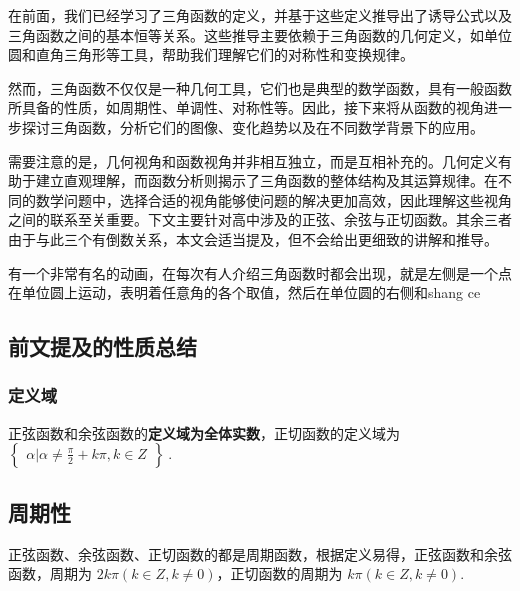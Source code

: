 
\begin{issues}
\issueDraft
\end{issues}


在前面，我们已经学习了三角函数的定义，并基于这些定义推导出了诱导公式以及三角函数之间的基本恒等关系。这些推导主要依赖于三角函数的几何定义，如单位圆和直角三角形等工具，帮助我们理解它们的对称性和变换规律。

然而，三角函数不仅仅是一种几何工具，它们也是典型的数学函数，具有一般函数所具备的性质，如周期性、单调性、对称性等。因此，接下来将从函数的视角进一步探讨三角函数，分析它们的图像、变化趋势以及在不同数学背景下的应用。

需要注意的是，几何视角和函数视角并非相互独立，而是互相补充的。几何定义有助于建立直观理解，而函数分析则揭示了三角函数的整体结构及其运算规律。在不同的数学问题中，选择合适的视角能够使问题的解决更加高效，因此理解这些视角之间的联系至关重要。下文主要针对高中涉及的正弦、余弦与正切函数。其余三者由于与此三个有倒数关系，本文会适当提及，但不会给出更细致的讲解和推导。

有一个非常有名的动画，在每次有人介绍三角函数时都会出现，就是左侧是一个点在单位圆上运动，表明着任意角的各个取值，然后在单位圆的右侧和shang ce

\subsection{前文提及的性质总结}

\subsubsection{定义域}

正弦函数和余弦函数的\textbf{定义域为全体实数}，正切函数的定义域为 $\begin{Bmatrix}\alpha|\alpha \neq \frac{\pi}{2}+k\pi,k\in Z\end{Bmatrix}~.$

\subsection{周期性}

正弦函数、余弦函数、正切函数的都是周期函数，根据定义易得，正弦函数和余弦函数，周期为 $2k\pi(k\in Z,k\neq0)$，正切函数的周期为 $k\pi(k\in Z,k\neq0)$.


